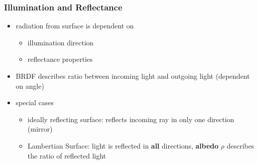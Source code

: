 \documentclass[11pt]{article}
\begin{document}
\subsubsection{Illumination and Reflectance}
\label{sec-6-3-1}
\begin{itemize}
\item radiation from surface is dependent on
\begin{itemize}
\item illumination direction
\item reflectance properties
\end{itemize}
\item BRDF describes ratio between incoming light and outgoing light (dependent on angle)
\item special cases
\begin{itemize}
\item ideally reflecting surface: reflects incoming ray in only one direction (mirror)
\item Lambertian Surface: light is reflected in \textbf{all} directions, \textbf{albedo} $\rho$
describes the ratio of reflected light
\end{itemize}
\end{itemize}
\end{document}
